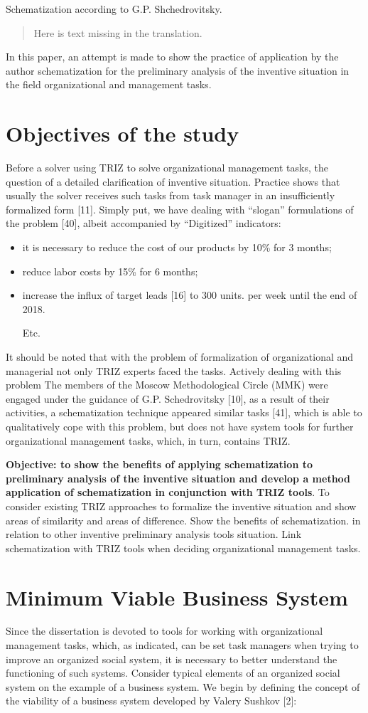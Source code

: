 \documentclass[11pt,a4paper]{book}
\newcommand{\Missing}{
  \begin{quote} Here is text missing in the translation.\end{quote}
}
\begin{document}
Schematization according to G.P. Shchedrovitsky.

\Missing

In this paper, an attempt is made to show the practice of application by the
author schematization for the preliminary analysis of the inventive situation
in the field organizational and management tasks.

\section{Objectives of the study}
Before a solver using TRIZ to solve organizational management tasks, the
question of a detailed clarification of inventive situation. Practice shows
that usually the solver receives such tasks from task manager in an
insufficiently formalized form [11]. Simply put, we have dealing with “slogan”
formulations of the problem [40], albeit accompanied by “Digitized”
indicators:
\begin{itemize}
\item it is necessary to reduce the cost of our products by 10\% for 3 months;
\item reduce labor costs by 15\% for 6 months;
\item increase the influx of target leads [16] to 300 units. per week until
  the end of 2018.
  
  Etc.
\end{itemize}
It should be noted that with the problem of formalization of organizational
and managerial not only TRIZ experts faced the tasks. Actively dealing with
this problem The members of the Moscow Methodological Circle (MMK) were
engaged under the guidance of G.P.  Schedrovitsky [10], as a result of their
activities, a schematization technique appeared similar tasks [41], which is
able to qualitatively cope with this problem, but does not have system tools
for further organizational management tasks, which, in turn, contains TRIZ.

\textbf{Objective: to show the benefits of applying schematization to
  preliminary analysis of the inventive situation and develop a method
  application of schematization in conjunction with TRIZ tools}. To consider
existing TRIZ approaches to formalize the inventive situation and show areas
of similarity and areas of difference. Show the benefits of schematization.
in relation to other inventive preliminary analysis tools situation. Link
schematization with TRIZ tools when deciding organizational management tasks.

\section{Minimum Viable Business System}
Since the dissertation is devoted to tools for working with organizational
management tasks, which, as indicated, can be set task managers when trying to
improve an organized social system, it is necessary to better understand the
functioning of such systems. Consider typical elements of an organized social
system on the example of a business system.  We begin by defining the concept
of the viability of a business system developed by Valery Sushkov [2]:
\end{document}
